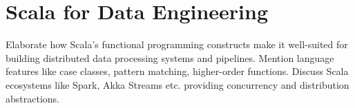 \chapter{Scala for Data Engineering}

Elaborate how Scala's functional programming constructs make it well-suited for building distributed data processing systems and pipelines. Mention language features like case classes, pattern matching, higher-order functions. Discuss Scala ecosystems like Spark, Akka Streams etc. providing concurrency and distribution abstractions. 
